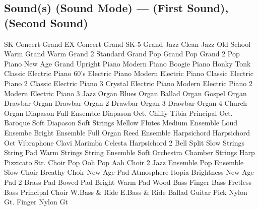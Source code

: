 \subsection[Sound(s) (Sound Mode)]{Sound(s) (Sound Mode) --- \UiKey{\I}\UiKey{\SND} (First Sound), \UiKey{\II}\UiKey{\SND} (Second Sound)}
SK Concert Grand
EX Concert Grand
SK-5 Grand
Jazz Clean
Jazz Old School
Warm Grand
Warm Grand 2
Standard Grand
Pop Grand
Pop Grand 2
Pop Piano
New Age Grand
Upright Piano
Modern Piano
Boogie Piano
Honky Tonk
Classic Electric Piano
60's Electric Piano
Modern Electric Piano
Classic Electric Piano 2
Classic Electric Piano 3
Crystal Electric Piano
Modern Electric Piano 2
Modern Electric Piano 3
Jazz Organ
Blues Organ
Ballad Organ
Gospel Organ
Drawbar Organ
Drawbar Organ 2
Drawbar Organ 3
Drawbar Organ 4
Church Organ
Diapason
Full Ensemble
Diapason Oct.
Chiffy Tibia
Principal Oct.
Baroque
Soft Diapason
Soft Strings
Mellow Flutes
Medium Ensemble
Loud Ensembe
Bright Ensemble
Full Organ
Reed Ensemble
Harpsichord
Harpsichord Oct
Vibraphone
Clavi
Marimba
Celesta
Harpsichord 2
Bell Split
Slow Strings
String Pad
Warm Strings
String Ensemble
Soft Orchestra
Chamber Strings
Harp
Pizzicato Str.
Choir
Pop Ooh
Pop Aah
Choir 2
Jazz Ensemble
Pop Ensemble
Slow Choir
Breathy Choir
New Age Pad
Atmosphere
Itopia
Brightness
New Age Pad 2
Brass Pad
Bowed Pad
Bright Warm Pad
Wood Bass
Finger Bass
Fretless Bass
Principal Choir
W.Bass \& Ride
E.Bass \& Ride
Ballad Guitar
Pick Nylon Gt.
Finger Nylon Gt
